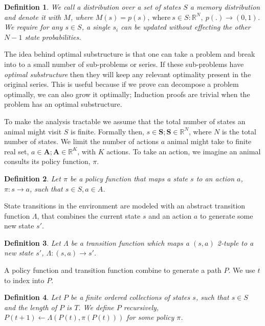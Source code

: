 \documentclass[9pt,twocolumn,twoside]{pnas-new}
\newtheorem{definition}{Definition}
\begin{document}
\begin{definition}
    We call a distribution over a set of states $S$ a \textit{memory distribution} and denote it with $M$, where $M(s) = p(s), \ \text{where} \ s \in S : \mathbb{R}^N, \ p(.) \rightarrow (0, 1)$. We require for any $s \in S$, a single $s_i$ can be updated without effecting the other $N-1$ state probabilities. 
\end{definition}

The idea behind optimal substructure is that one can take a problem and break into to a small number of sub-problems or series. If these sub-problems have \textit{optimal substructure} then they will keep any relevant optimality present in the original series.  This is useful because if we prove can decompose a problem optimally, we can also grow it optimally; Induction proofs are trivial when the problem has an optimal substructure. 

To make the analysis tractable we assume that the total number of states an animal might visit $S$ is finite. Formally then, $s \in \textbf{S}; \textbf{S} \in \mathbb{R}^N$, where $N$ is the total number of states. We limit the number of actions $a$ animal might take to finite real set, $a \in \textbf{A}; \textbf{A} \in \mathbb{R}^K$, with $K$ actions. To take an action, we imagine an animal consults its policy function, $\pi$. 

\begin{definition}
    Let $\pi$ be a policy function that maps a state $s$ to an action $a$, $\pi : s \rightarrow a$, such that $s \in S, a \in A$.
\end{definition}

State transitions in the environment are modeled with an abstract transition function $\Lambda$, that combines the current state $s$ and an action $a$ to generate some new state $s'$.

\begin{definition}
    Let $\Lambda$ be a transition function which maps a $(s,a)$ 2-tuple to a new state $s'$, $\Lambda : (s, a) \rightarrow s'$.     
\end{definition}

A policy function and transition function combine to generate a path $P$. We use $t$ to index into $P$. 

\begin{definition}
    Let $P$ be a finite ordered collections of states $s$, such that $s \in S$ and the length of $P$ is $T$. We define $P$ recursively, $P(t+1) \leftarrow \Lambda(P(t), \pi(P(t)))$ for some policy $\pi$.
\end{definition}
\end{document}
